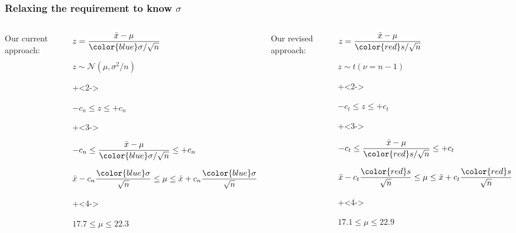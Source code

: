 \begin{frame}\frametitle{Relaxing the requirement to know $\sigma$}
	
	\begin{columns}[t]
			Our current approach:
			\begin{itemize}
				
				\item	$z = \dfrac{\bar{x} - \mu}{{\color{blue}\sigma} / \sqrt{n}}$
				
				\vspace{10pt}
				\item	$z \sim \mathcal{N}\left(\mu, \sigma^2/n \right)$
				
				\onslide+<2->{
				\vspace{10pt}
				\item	$\displaystyle -c_n \leq z \leq +c_n$
				}
				\onslide+<3->{
				\vspace{10pt}
				\item	$\displaystyle -c_n \leq  \dfrac{\bar{x} - \mu}{{\color{blue}\sigma} / \sqrt{n}} \leq +c_n$
				
				\vspace{10pt}
				\item	$\displaystyle \bar{x} - c_n\frac{{\color{blue}\sigma}}{\sqrt{n}} \leq \mu \leq \bar{x} + c_n\frac{{\color{blue}\sigma}}{\sqrt{n}}$
				}
				
				\onslide+<4->{
				\vspace{10pt}
				\item	$17.7 \leq \mu \leq 22.3$
				}
				
			\end{itemize}
			
		\column{0.5\textwidth}
			Our revised approach:
			\begin{itemize}
				
				\item	$z = \dfrac{\bar{x} - \mu}{{\color{red}s}/ \sqrt{n}}$
				
				
				\vspace{10pt}
				\item	$z \sim t\left(\nu=n-1 \right)$
				
				\onslide+<2->{
				\vspace{10pt}
				\item	$\displaystyle -c_t \leq z \leq +c_t$
				}
				\onslide+<3->{
				\vspace{10pt}
				\item	$\displaystyle -c_t \leq  \dfrac{\bar{x} - \mu}{{\color{red}s} / \sqrt{n}} \leq +c_t$
				
				\vspace{10pt}
				\item	$\displaystyle \bar{x} - c_t\frac{{\color{red}s}}{\sqrt{n}} \leq \mu \leq \bar{x} + c_t\frac{{\color{red}s}}{\sqrt{n}}$
				}
				
				\onslide+<4->{
				\vspace{10pt}
				\item	$17.1 \leq \mu \leq 22.9$
				}
			\end{itemize}
			
	\end{columns}
\end{frame}

